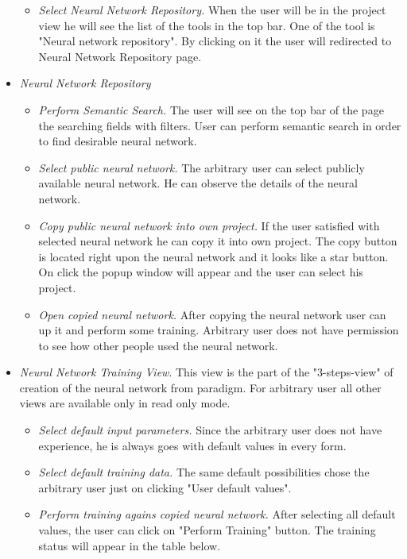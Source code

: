 \begin{itemize}
\begin{itemize}
\item \emph{Select Neural Network Repository.} When the user will be in the project view he will see the list of the tools in the top bar. One of the tool is "Neural network repository". By clicking on it the user will redirected to Neural Network Repository page.
\end{itemize}
\item \emph{Neural Network Repository}
\begin{itemize}
\item \emph{Perform Semantic Search.} The user will see on the top bar of the page the searching fields with filters. User can perform semantic search in order to find desirable neural network. 
\item \emph{Select public neural network.} The arbitrary user can select publicly available neural network. He can observe the details of the neural network.
\item \emph{Copy public neural network into own project.} If the user satisfied with selected neural network he can copy it into own project. The copy button is located right upon the neural network and it looks like a star button. On click the popup window will appear and the user can select his project.
\item \emph{Open copied neural network.} After copying the neural network user can up it and perform some training. Arbitrary user does not have permission to see how other people used the neural network.
\end{itemize}

\item \emph{Neural Network Training View}. This view is the part of the "3-steps-view" of creation of the neural network from paradigm. For arbitrary user all other views are available only in read only mode.
\begin{itemize}
\item \emph{Select default input parameters.} Since the arbitrary user does not have experience, he is always goes with default values in every form.
\item \emph{Select default training data.} The same default possibilities chose the arbitrary user just on clicking "User default values".
\item \emph{Perform training agains copied neural network.} After selecting all default values, the user can click on "Perform Training" button. The training status will appear in the table below.
\end{itemize}


\end{itemize}
